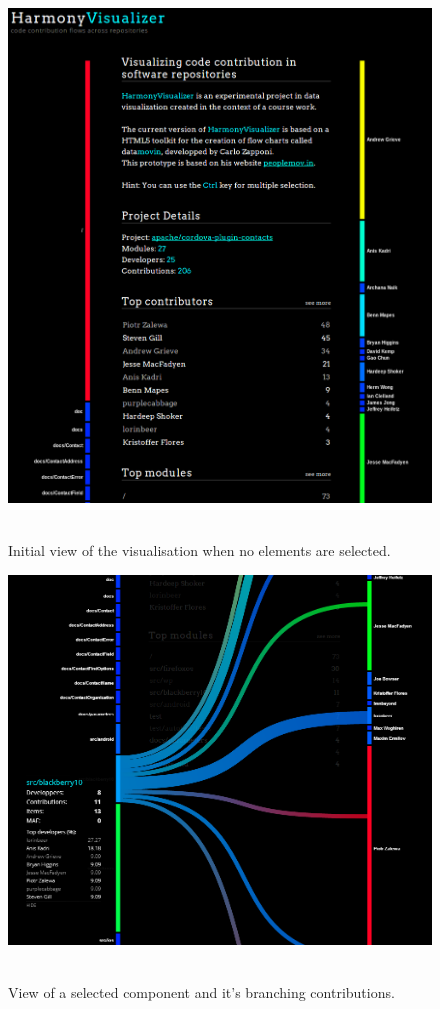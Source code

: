 \begin{figure}[H]
\centering
\includegraphics[width=1\textwidth]{./resources/visualiser_default.png}~
\caption{Initial view of the visualisation when no elements are selected.}
\label{fig:visualiser_default}
\end{figure}

\begin{figure}[H]
\centering
\includegraphics[width=1\textwidth]{./resources/visualiser_com.png}~
\caption{View of a selected component and it's branching contributions.}
\label{fig:visualiser_dev}
\end{figure}

